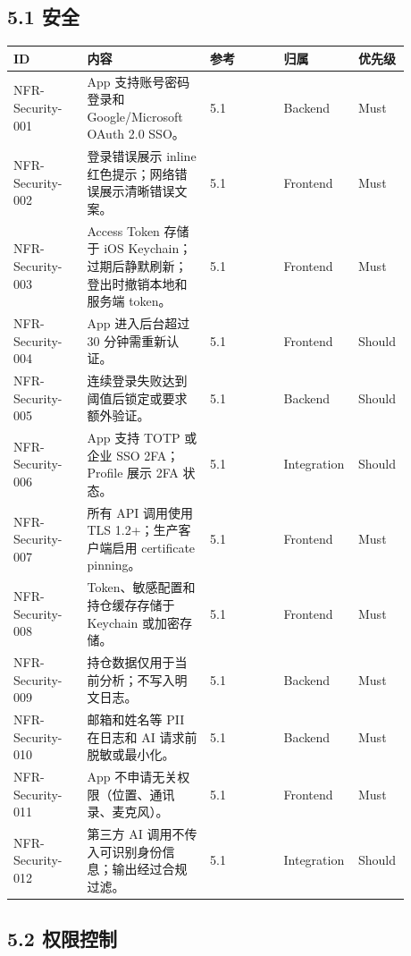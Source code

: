 \subsection{5.1 安全}

\begingroup
\small
\begin{longtable}{L{0.18\linewidth}L{0.30\linewidth}L{0.18\linewidth}L{0.12\linewidth}L{0.10\linewidth}}
\toprule
\textbf{ID} & \textbf{内容} & \textbf{参考} & \textbf{归属} & \textbf{优先级} \\
\midrule
NFR-Security-001 & App 支持账号密码登录和 Google/Microsoft OAuth 2.0 SSO。 & 5.1 & Backend & Must \\
NFR-Security-002 & 登录错误展示 inline 红色提示；网络错误展示清晰错误文案。 & 5.1 & Frontend & Must \\
NFR-Security-003 & Access Token 存储于 iOS Keychain；过期后静默刷新；登出时撤销本地和服务端 token。 & 5.1 & Frontend & Must \\
NFR-Security-004 & App 进入后台超过 30 分钟需重新认证。 & 5.1 & Frontend & Should \\
NFR-Security-005 & 连续登录失败达到阈值后锁定或要求额外验证。 & 5.1 & Backend & Should \\
NFR-Security-006 & App 支持 TOTP 或企业 SSO 2FA；Profile 展示 2FA 状态。 & 5.1 & Integration & Should \\
NFR-Security-007 & 所有 API 调用使用 TLS 1.2+；生产客户端启用 certificate pinning。 & 5.1 & Frontend & Must \\
NFR-Security-008 & Token、敏感配置和持仓缓存存储于 Keychain 或加密存储。 & 5.1 & Frontend & Must \\
NFR-Security-009 & 持仓数据仅用于当前分析；不写入明文日志。 & 5.1 & Backend & Must \\
NFR-Security-010 & 邮箱和姓名等 PII 在日志和 AI 请求前脱敏或最小化。 & 5.1 & Backend & Must \\
NFR-Security-011 & App 不申请无关权限（位置、通讯录、麦克风）。 & 5.1 & Frontend & Must \\
NFR-Security-012 & 第三方 AI 调用不传入可识别身份信息；输出经过合规过滤。 & 5.1 & Integration & Should \\
\bottomrule
\end{longtable}
\endgroup

\subsection{5.2 权限控制}

